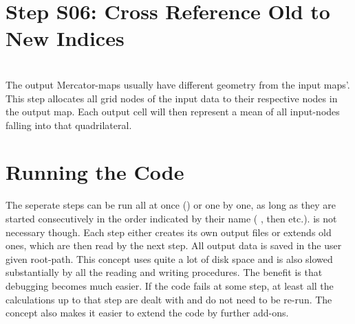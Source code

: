 


\section{Step S06: Cross Reference Old to New Indices} \label{S:06}
\\
The output Mercator-maps usually have different geometry from the input maps'.
This step allocates all grid nodes of the input data
to their respective nodes in the output map. Each output cell will then represent a mean of all input-nodes falling into that quadrilateral.



\section{Running the Code}
The seperate steps can be run all at once () or one by one, as
long as they are started consecutively in the order indicated by their name
( , then  etc.).  is not necessary
though. Each step either creates its own output files or extends old ones,  which are then read by the next step.
All output data is saved in the user given root-path.
This concept uses quite a lot of disk space and is also slowed substantially by all the reading and writing procedures. The benefit is that debugging becomes much easier. If the code fails at some step,
at least all the calculations up to that step are dealt with and do not need to
be re-run. The concept also makes it easier to extend the code by further
add-ons.
